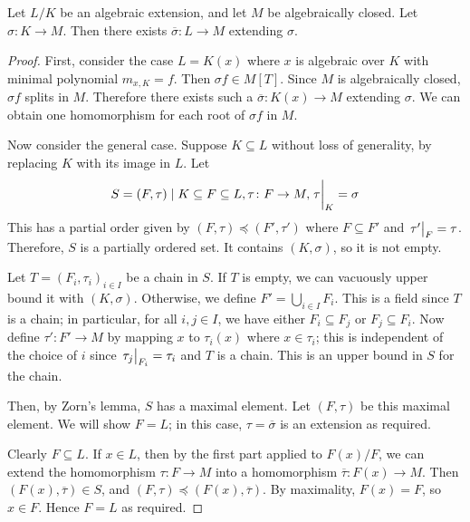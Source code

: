 \begin{proposition}
	Let \( L / K \) be an algebraic extension, and let \( M \) be algebraically closed.
	Let \( \sigma \colon K \to M \).
	Then there exists \( \overline \sigma \colon L \to M \) extending \( \sigma \).
\end{proposition}
\begin{proof}
	First, consider the case \( L = K(x) \) where \( x \) is algebraic over \( K \) with minimal polynomial \( m_{x,K} = f \).
	Then \( \sigma f \in M[T] \).
	Since \( M \) is algebraically closed, \( \sigma f \) splits in \( M \).
	Therefore there exists such a \( \overline \sigma \colon K(x) \to M \) extending \( \sigma \).
	We can obtain one homomorphism for each root of \( \sigma f \) in \( M \).

	Now consider the general case.
	Suppose \( K \subseteq L \) without loss of generality, by replacing \( K \) with its image in \( L \).
	Let
	\[ S = {(F,\tau) \mid K \subseteq F \subseteq L, \tau \colon F \to M, \eval{\tau}_K = \sigma} \]
	This has a partial order given by \( (F,\tau) \preceq (F',\tau') \) where \( F \subseteq F' \) and \( \eval{\tau'}_F = \tau \).
	Therefore, \( S \) is a partially ordered set.
	It contains \( (K, \sigma) \), so it is not empty.

	Let \( T = (F_i, \tau_i)_{i \in I} \) be a chain in \( S \).
	If \( T \) is empty, we can vacuously upper bound it with \( (K, \sigma) \).
	Otherwise, we define \( F' = \bigcup_{i \in I} F_i \).
	This is a field since \( T \) is a chain; in particular, for all \( i, j \in I \), we have either \( F_i \subseteq F_j \) or \( F_j \subseteq F_i \).
	Now define \( \tau' \colon F' \to M \) by mapping \( x \) to \( \tau_i(x) \) where \( x \in \tau_i \); this is independent of the choice of \( i \) since \( \eval{\tau_j}_{F_i} = \tau_i \) and \( T \) is a chain.
	This is an upper bound in \( S \) for the chain.

	Then, by Zorn's lemma, \( S \) has a maximal element.
	Let \( (F, \tau) \) be this maximal element.
	We will show \( F = L \); in this case, \( \tau = \overline \sigma \) is an extension as required.

	Clearly \( F \subseteq L \).
	If \( x \in L \), then by the first part applied to \( F(x) / F \), we can extend the homomorphism \( \tau \colon F \to M \) into a homomorphism \( \overline \tau \colon F(x) \to M \).
	Then \( (F(x), \overline \tau) \in S \), and \( (F,\tau) \preceq (F(x), \overline \tau) \).
	By maximality, \( F(x) = F \), so \( x \in F \).
	Hence \( F = L \) as required.
\end{proof}

